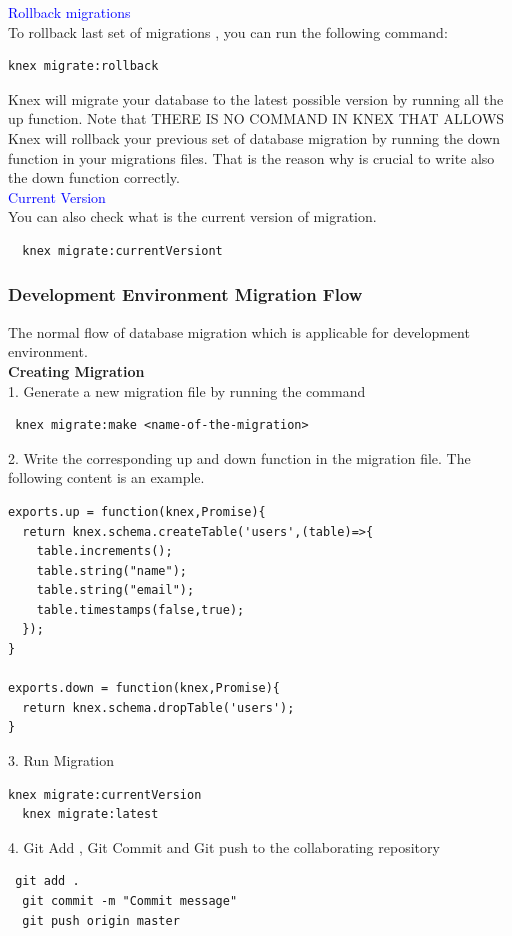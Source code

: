 \documentclass[a4paper]{article}
\begin{document}
\textcolor{blue}{Rollback migrations}\\
To rollback last set of migrations , you can run the following command:
\begin{lstlisting}
knex migrate:rollback
\end{lstlisting}
Knex will migrate your database to the latest possible version by running all the up function. Note that THERE IS NO COMMAND IN KNEX THAT ALLOWS Knex will rollback your previous set of database migration by running the down function in your migrations files. That is the reason why is crucial to write also the down function correctly.\\

\textcolor{blue}{Current Version}\\
You can also check what is the current version of migration.
\begin{lstlisting}
  knex migrate:currentVersiont
\end{lstlisting}

\subsubsection{Development Environment Migration Flow}
The normal flow of database migration which is applicable for development environment.\\

\textbf{Creating Migration}\\

1. Generate a new migration file by running the command
\begin{lstlisting}
 knex migrate:make <name-of-the-migration>
\end{lstlisting}
2. Write the corresponding up and down function in the migration file. The following content is an example.
\begin{lstlisting}
exports.up = function(knex,Promise){
  return knex.schema.createTable('users',(table)=>{
    table.increments();
    table.string("name");
    table.string("email");
    table.timestamps(false,true);
  });
}

exports.down = function(knex,Promise){
  return knex.schema.dropTable('users');
}
\end{lstlisting}
3. Run Migration
\begin{lstlisting}
knex migrate:currentVersion
  knex migrate:latest
\end{lstlisting}
4. Git Add , Git Commit and Git push to the collaborating repository
\begin{lstlisting}
 git add .
  git commit -m "Commit message"
  git push origin master
\end{lstlisting}
\end{document}
